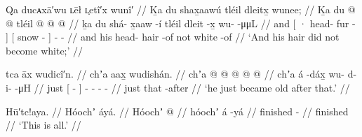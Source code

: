 
\ex\label{ex:100-232-and-no-white-hair}%
%
\begingl
	\glpreamble	Qa ducᴀxā′wu ʟēł ʟ̣etî′x wunî′ //
	\glpreamble	Ḵa du shax̱aawú tléil dleitx̱ wunee; //
	\gla	Ḵa {} du  @ {} @ {} {}
		tléil
		{}  @ {} {} 
		 @ {} @ {} //
	\glb	ḵa {} du shá- x̱aaw -í {}
		tléil
		{} dleit -x̱ {} 
		wu-  -μμL //
	\glc	and {}[ · head- fur - {}]
		{}[ snow - {}]
		-  - //
	\gld	and {} his head- hair -of {}
		not
		{} white -of {} 
		 {} {} {} {} {} //
	\glft	‘And his hair did not become white;’
		//
\endgl
\xe

\ex\label{ex:100-234-just-old}%
%
\begingl
	\glpreamble	tca āx wudicî′n. //
	\glpreamble	chʼa aax̱ wudishán. //
	\gla	chʼa {}  @ {} {} 
		 @ {} @ {} @ {} @ {} //
	\glb	chʼa {} á -dáx̱ {}
		wu- d- i-  -μH //
	\glc	just {}[  - {}]
		- - -  - //
	\gld	just {} that -after {} 
		 {} {} {} {} //
	\glft	‘he just became old after that.’
		//
\endgl
\xe

\ex\label{ex:100-234-just-old}%
%
\begingl
	\glpreamble	Hū′tc!aya. //
	\glpreamble	Hóochʼ áyá. //
	\gla	Hóochʼ  @ {} //
	\glb	hóochʼ á -yá //
	\glc	finished  - //
	\gld	finished  {} //
	\glft	‘This is all.’
		//
\endgl
\xe
